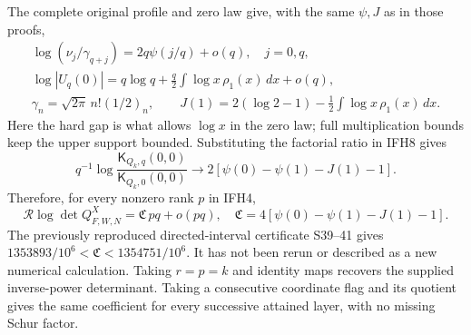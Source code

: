 \documentclass[11pt]{article}
\begin{document}
The complete original profile and zero law \cite{Profile,NG,Smallest}
give, with the same $\psi,J$ as in those proofs,
\[
\begin{gathered}
\log(\nu_j/\gamma_{q+j})=2q\psi(j/q)+o(q),\quad j=0,q,\\
\log|U_q(0)|=q\log q+\tfrac q2\int\log x\,\rho_1(x)\,dx+o(q),\\
\gamma_n=\sqrt{2\pi}\,n!(1/2)_n,\qquad
J(1)=2(\log2-1)-\tfrac12\int\log x\,\rho_1(x)\,dx.
\end{gathered}
\]
Here the hard gap is what allows $\log x$ in the zero law; full
multiplication bounds keep the upper support bounded.
Substituting the factorial ratio in IFH8 gives
\[
q^{-1}\log\frac{\mathsf K_{Q_k,q}(0,0)}
{\mathsf K_{Q_k,0}(0,0)}
\longrightarrow2[\psi(0)-\psi(1)-J(1)-1].
\]
Therefore, for every nonzero rank $p$ in IFH4,
\[
\boxed{\mathcal R\log\det Q^X_{F,W,N}
=\mathfrak C\,p q+o(pq),\quad
\mathfrak C=4[\psi(0)-\psi(1)-J(1)-1].}
\tag{IFH10}
\]
The previously reproduced directed-interval certificate S39--41 gives
$1353893/10^6<\mathfrak C<1354751/10^6$.
It has not been rerun or described as a new numerical calculation.
Taking $r=p=k$ and identity maps recovers the supplied inverse-power
determinant. Taking a consecutive coordinate flag and its quotient
gives the same coefficient for every successive attained layer,
with no missing Schur factor.
\end{document}
